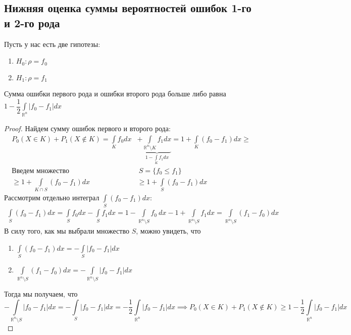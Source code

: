 \subsection{Нижняя оценка суммы вероятностей ошибок 1-го и 2-го рода}
\begin{theorem*}
Пусть у нас есть две гипотезы:
\begin{enumerate}
    \item $H_0:\rho=f_0$
    \item $H_1:\rho=f_1$
\end{enumerate}
Сумма ошибки первого рода и ошибки второго рода больше либо равна $1-\dfrac{1}{2}\int\limits_{\mathbb{R}^n}|f_0-f_1|dx$
\end{theorem*}
\begin{proof}
Найдем сумму ошибок первого и второго рода:
        \begin{align}
            P_{0}(X\in K)+P_{1}(X\notin K) =\int\limits_{K}f_0dx&+\underbrace{\int\limits_{\mathbb{R}^n\setminus K}f_1dx}_{1-\int\limits_K f_1dx}=1+\int\limits_{K}(f_0-f_1)dx\geq
        \\
        \text{Введем множество}&\ S=\{f_0\leq f_1\} 
        \\
        \geq 1+\int\limits_{K\cap S}(f_0-f_1)dx &\geq 1+\int\limits_{S}(f_0-f_1)dx
        \end{align}
Рассмотрим отдельно интеграл $\int\limits_{S}(f_0-f_1)dx$:
\begin{align}
            \int\limits_{S}(f_0-f_1)dx=\int\limits_{S}f_0dx-\int\limits_{S}f_1dx=1-\int\limits_{\mathbb{R}^n\setminus S}f_0\ dx-1+\int\limits_{\mathbb{R}^n\setminus S}f_1dx =\int\limits_{\mathbb{R}^n\setminus S}(f_1-f_0)dx
        \end{align}
В силу того, как мы выбрали множество $S$, можно увидеть, что
\begin{enumerate}
    \item $\int\limits_{S}(f_0-f_1)dx=-\int\limits_{S}|f_0-f_1|dx$
    \item $\int\limits_{\mathbb{R}^n\setminus S}(f_1 -f_0)dx=-\int\limits_{\mathbb{R}^n\setminus S}|f_0-f_1|dx$
\end{enumerate}
Тогда мы получаем, что $$-\int\limits_{\mathbb{R}^n\setminus S}|f_0-f_1|dx=-\int\limits_{S}|f_0-f_1|dx=-\dfrac{1}{2}\int\limits_{\mathbb{R}^n}|f_0-f_1|dx\implies P_{0}(X\in K)+P_{1}(X\notin K)\geq 1-\dfrac{1}{2}\int\limits_{\mathbb{R}^n}|f_0-f_1|dx$$
\end{proof}
